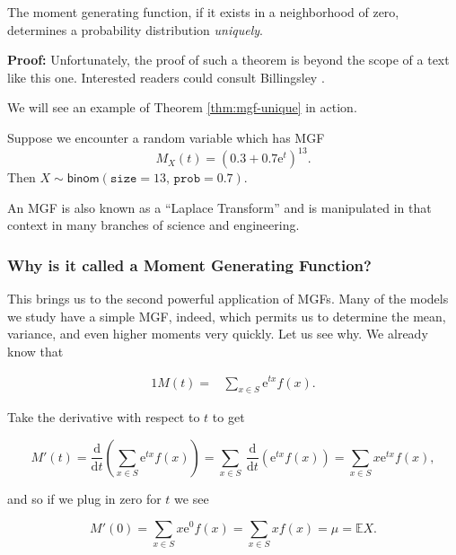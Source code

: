 \documentclass[]{book}
\numberwithin{equation}{chapter}
\numberwithin{figure}{chapter}
\theoremstyle{plain}
\theoremstyle{definition}
\theoremstyle{remark}
\theoremstyle{definition}
\theoremstyle{definition}
\theoremstyle{remark}
\let\BeginKnitrBlock\begin \let\EndKnitrBlock\end
\begin{document}
\bigskip

\BeginKnitrBlock{theorem}
\protect\hypertarget{thm:mgf-unique}{}{\label{thm:mgf-unique}}The moment
generating function, if it exists in a neighborhood of zero, determines
a probability distribution \emph{uniquely}.
\EndKnitrBlock{theorem}

\textbf{Proof:} Unfortunately, the proof of such a theorem is beyond the
scope of a text like this one. Interested readers could consult
Billingsley \autocite{Billingsley1995}.

We will see an example of Theorem \ref{thm:mgf-unique} in action.

\bigskip

\BeginKnitrBlock{example}
\protect\hypertarget{ex:unnamed-chunk-217}{}{\label{ex:unnamed-chunk-217}}Suppose
we encounter a random variable which has MGF \[
M_{X}(t)=(0.3+0.7\mathrm{e}^{t})^{13}.
\] Then \(X\sim\mathsf{binom}(\mathtt{size}=13,\,\mathtt{prob}=0.7)\).
\EndKnitrBlock{example}

An MGF is also known as a ``Laplace Transform'' and is manipulated in
that context in many branches of science and engineering.

\subsubsection{Why is it called a Moment Generating
Function?}\label{why-is-it-called-a-moment-generating-function}

This brings us to the second powerful application of MGFs. Many of the
models we study have a simple MGF, indeed, which permits us to determine
the mean, variance, and even higher moments very quickly. Let us see
why. We already know that

\begin{alignat*}{1}
M(t)= & \sum_{x\in S}\mathrm{e}^{tx}f(x).
\end{alignat*}

Take the derivative with respect to \(t\) to get

\begin{equation}
M'(t)=\frac{\mathrm{d}}{\mathrm{d} t}\left(\sum_{x\in S}\mathrm{e}^{tx}f(x)\right)=\sum_{x\in S}\ \frac{\mathrm{d}}{\mathrm{d} t}\left(\mathrm{e}^{tx}f(x)\right)=\sum_{x\in S}x\mathrm{e}^{tx}f(x),
\end{equation}

and so if we plug in zero for \(t\) we see

\begin{equation}
M'(0)=\sum_{x\in S}x\mathrm{e}^{0}f(x)=\sum_{x\in S}xf(x)=\mu=\mathbb{E} X.
\end{equation}
\end{document}
